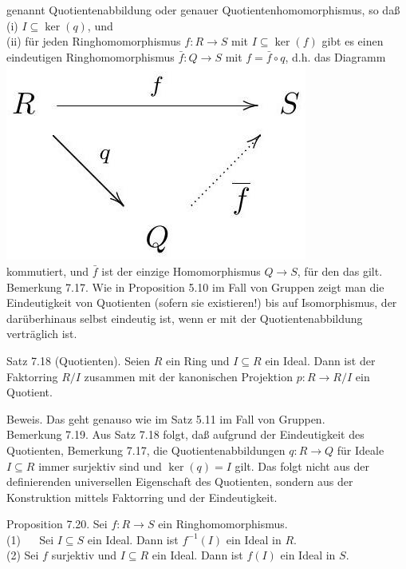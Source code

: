 \documentclass[10pt, letterpaper]{article}
\begin{document}
genannt Quotientenabbildung oder genauer Quotientenhomomorphismus, so daß\\
(i) $I \subseteq \operatorname{ker}(q)$, und\\
(ii) für jeden Ringhomomorphismus $f: R \rightarrow S$ mit $I \subseteq \operatorname{ker}(f)$ gibt es einen eindeutigen Ringhomomorphismus $\bar{f}: Q \rightarrow S$ mit $f=\bar{f} \circ q$, d.h. das Diagramm\\
\includegraphics[max width=\textwidth, center]{2025_06_13_6ba93caed1e95a95104eg-062}\\
kommutiert, und $\bar{f}$ ist der einzige Homomorphismus $Q \rightarrow S$, für den das gilt.\\
Bemerkung 7.17. Wie in Proposition 5.10 im Fall von Gruppen zeigt man die Eindeutigkeit von Quotienten (sofern sie existieren!) bis auf Isomorphismus, der darüberhinaus selbst eindeutig ist, wenn er mit der Quotientenabbildung verträglich ist.

Satz 7.18 (Quotienten). Seien $R$ ein Ring und $I \subseteq R$ ein Ideal. Dann ist der Faktorring $R / I$ zusammen mit der kanonischen Projektion $p: R \rightarrow R / I$ ein Quotient.

Beweis. Das geht genauso wie im Satz 5.11 im Fall von Gruppen.\\
Bemerkung 7.19. Aus Satz 7.18 folgt, daß aufgrund der Eindeutigkeit des Quotienten, Bemerkung 7.17, die Quotientenabbildungen $q: R \rightarrow Q$ für Ideale $I \subseteq R$ immer surjektiv sind und $\operatorname{ker}(q)=I$ gilt. Das folgt nicht aus der definierenden universellen Eigenschaft des Quotienten, sondern aus der Konstruktion mittels Faktorring und der Eindeutigkeit.

Proposition 7.20. Sei $f: R \rightarrow S$ ein Ringhomomorphismus.\\
(1) $\quad$ Sei $I \subseteq S$ ein Ideal. Dann ist $f^{-1}(I)$ ein Ideal in $R$.\\
(2) Sei $f$ surjektiv und $I \subseteq R$ ein Ideal. Dann ist $f(I)$ ein Ideal in $S$.
\end{document}

